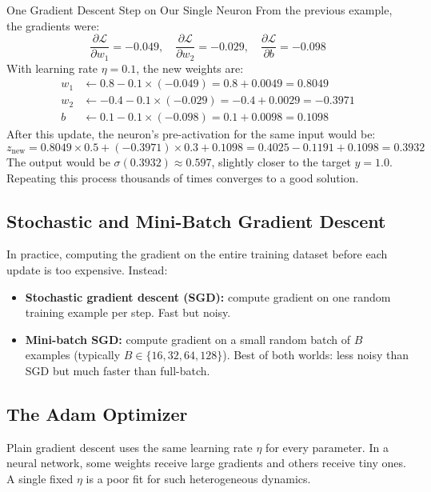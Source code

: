 \begin{examplebox}{One Gradient Descent Step on Our Single Neuron}
From the previous example, the gradients were:
\[
    \frac{\partial \mathcal{L}}{\partial w_1} = -0.049, \quad
    \frac{\partial \mathcal{L}}{\partial w_2} = -0.029, \quad
    \frac{\partial \mathcal{L}}{\partial b} = -0.098
\]
With learning rate $\eta = 0.1$, the new weights are:
\begin{align*}
    w_1 &\leftarrow 0.8 - 0.1 \times (-0.049) = 0.8 + 0.0049 = 0.8049 \\
    w_2 &\leftarrow -0.4 - 0.1 \times (-0.029) = -0.4 + 0.0029 = -0.3971 \\
    b   &\leftarrow 0.1 - 0.1 \times (-0.098) = 0.1 + 0.0098 = 0.1098
\end{align*}
After this update, the neuron's pre-activation for the same input would be:
\[
    z_{\text{new}} = 0.8049 \times 0.5 + (-0.3971) \times 0.3 + 0.1098
    = 0.4025 - 0.1191 + 0.1098 = 0.3932
\]
The output would be $\sigma(0.3932) \approx 0.597$, slightly closer to the target $y = 1.0$. Repeating this process thousands of times converges to a good solution.
\end{examplebox}

\subsection{Stochastic and Mini-Batch Gradient Descent}

In practice, computing the gradient on the entire training dataset before each update is too expensive. Instead:

\begin{itemize}
    \item \textbf{Stochastic gradient descent (SGD):} compute gradient on one random training example per step. Fast but noisy.
    \item \textbf{Mini-batch SGD:} compute gradient on a small random batch of $B$ examples (typically $B \in \{16, 32, 64, 128\}$). Best of both worlds: less noisy than SGD but much faster than full-batch.
\end{itemize}

\subsection{The Adam Optimizer}

Plain gradient descent uses the same learning rate $\eta$ for every parameter. In a neural network, some weights receive large gradients and others receive tiny ones. A single fixed $\eta$ is a poor fit for such heterogeneous dynamics.

